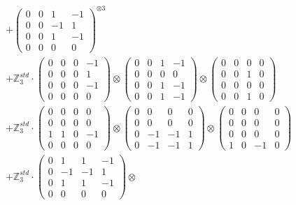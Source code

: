 \documentclass{article}
\begin{document}
{\begin{align}
        &+ \label{Rs16-Rc11-Solution-23-c16} \begin{pmatrix} 0 & 0 & 1 & -1 \\ 0 & 0 & -1 & 1 \\ 0 & 0 & 1 & -1 \\ 0 & 0 & 0 & 0 \end{pmatrix}^{\otimes 3} \\
        &+ \label{Rs16-Rc11-Solution-23-c17} \mathbb{Z}_3^{std} \cdot 
            \begin{pmatrix} 0 & 0 & 0 & -1 \\ 0 & 0 & 0 & 1 \\ 0 & 0 & 0 & -1 \\ 0 & 0 & 0 & 0 \end{pmatrix} \otimes 
            \begin{pmatrix} 0 & 0 & 1 & -1 \\ 0 & 0 & 0 & 0 \\ 0 & 0 & 1 & -1 \\ 0 & 0 & 1 & -1 \end{pmatrix} \otimes 
            \begin{pmatrix} 0 & 0 & 0 & 0 \\ 0 & 0 & 1 & 0 \\ 0 & 0 & 0 & 0 \\ 0 & 0 & 1 & 0 \end{pmatrix} \\ 
        &+ \label{Rs16-Rc11-Solution-23-c18} \mathbb{Z}_3^{std} \cdot 
            \begin{pmatrix} 0 & 0 & 0 & 0 \\ 0 & 0 & 0 & 0 \\ 1 & 1 & 0 & -1 \\ 0 & 0 & 0 & 0 \end{pmatrix} \otimes 
            \begin{pmatrix} 0 & 0 & 0 & 0 \\ 0 & 0 & 0 & 0 \\ 0 & -1 & -1 & 1 \\ 0 & -1 & -1 & 1 \end{pmatrix} \otimes 
            \begin{pmatrix} 0 & 0 & 0 & 0 \\ 0 & 0 & 0 & 0 \\ 0 & 0 & 0 & 0 \\ 1 & 0 & -1 & 0 \end{pmatrix} \\ 
        &+ \label{Rs16-Rc11-Solution-23-c19} \mathbb{Z}_3^{std} \cdot 
            \begin{pmatrix} 0 & 1 & 1 & -1 \\ 0 & -1 & -1 & 1 \\ 0 & 1 & 1 & -1 \\ 0 & 0 & 0 & 0 \end{pmatrix} \otimes 

\end{align}}
\end{document}
